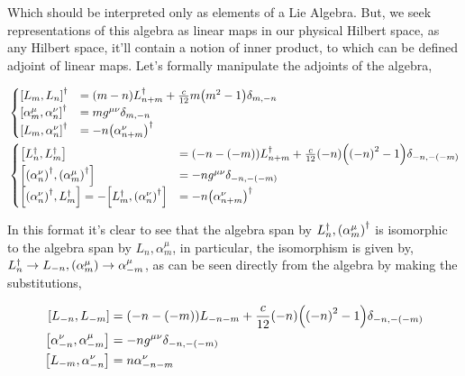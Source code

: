 Which should be interpreted only as elements of a Lie Algebra. But, we seek representations of this algebra as linear 
maps in our physical Hilbert space, as any Hilbert space, it'll contain a notion of inner product, to which can be defined 
adjoint of linear maps. Let's formally manipulate the adjoints of the algebra,

\begin{align*}
    &\begin{cases}
        \comm{L_m}{L_n}^\dagger&=\qty(m-n)L^\dagger_{n+m}+\frac{c}{12}m\qty(m^2-1)\delta_{m,-n}\\
        \comm{\alpha^\mu_m}{\alpha^\nu_n}^\dagger&=mg^{\mu\nu}\delta_{m,-n}\\
        \comm{L_m}{\alpha^\nu_n}^\dagger&=-n\qty(\alpha^\nu_{n+m})^\dagger
    \end{cases}\\
    &\begin{cases}
        \comm{L^\dagger_n}{L^\dagger_m}&=\qty(-n-\qty(-m))L^\dagger_{n+m}+\frac{c}{12}\qty(-n)\qty(\qty(-n)^2-1)\delta_{-n,-\qty(-m)}\\
        \comm{\qty(\alpha^\nu_n)^\dagger}{\qty(\alpha^\mu_m)^\dagger}&=-ng^{\mu\nu}\delta_{-n,-\qty(-m)}\\
        \comm{\qty(\alpha^\nu_n)^\dagger}{L^\dagger_m}=-\comm{L^\dagger_m}{\qty(\alpha^\nu_n)^\dagger}&=-n\qty(\alpha^\nu_{n+m})^\dagger
    \end{cases}
\end{align*}

In this format it's clear to see that the algebra span by $L^\dagger_n,\qty(\alpha_m^\mu)^\dagger$ is isomorphic to the algebra span by $L_n,\alpha_m^\mu$, 
in particular, the isomorphism is given by, $L^\dagger_n\rightarrow L_{-n},\qty(\alpha^\mu_m)\rightarrow\alpha^\mu_{-m}$, as can be seen directly from 
the algebra by making the substitutions,

\begin{align*}
    \comm{L_{-n}}{L_{-m}}&=\qty(-n-\qty(-m))L_{-n-m}+\frac{c}{12}\qty(-n)\qty(\qty(-n)^2-1)\delta_{-n,-\qty(-m)}\\
    \comm{\alpha^\nu_{-n}}{\alpha^\mu_{-m}}&=-ng^{\mu\nu}\delta_{-n,-\qty(-m)}\\
    \comm{L_{-m}}{\alpha^\nu_{-n}}&=n\alpha^\nu_{-n-m}
\end{align*}


